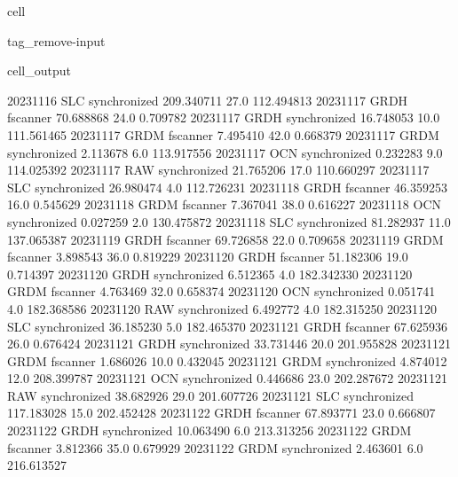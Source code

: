 \documentclass[letterpaper,10pt,english]{jupyterBook}
\begin{document}
\begin{sphinxuseclass}{cell}
\begin{sphinxuseclass}{tag_remove-input}
\begin{sphinxVerbatimOutput}
\begin{sphinxuseclass}{cell_output}
\begin{sphinxVerbatim}[commandchars=\\\{\}]
2023\PYGZhy{}11\PYGZhy{}16          SLC  synchronized  209.340711    27.0  112.494813
2023\PYGZhy{}11\PYGZhy{}17         GRDH      fscanner   70.688868    24.0    0.709782
2023\PYGZhy{}11\PYGZhy{}17         GRDH  synchronized   16.748053    10.0  111.561465
2023\PYGZhy{}11\PYGZhy{}17         GRDM      fscanner    7.495410    42.0    0.668379
2023\PYGZhy{}11\PYGZhy{}17         GRDM  synchronized    2.113678     6.0  113.917556
2023\PYGZhy{}11\PYGZhy{}17          OCN  synchronized    0.232283     9.0  114.025392
2023\PYGZhy{}11\PYGZhy{}17          RAW  synchronized   21.765206    17.0  110.660297
2023\PYGZhy{}11\PYGZhy{}17          SLC  synchronized   26.980474     4.0  112.726231
2023\PYGZhy{}11\PYGZhy{}18         GRDH      fscanner   46.359253    16.0    0.545629
2023\PYGZhy{}11\PYGZhy{}18         GRDM      fscanner    7.367041    38.0    0.616227
2023\PYGZhy{}11\PYGZhy{}18          OCN  synchronized    0.027259     2.0  130.475872
2023\PYGZhy{}11\PYGZhy{}18          SLC  synchronized   81.282937    11.0  137.065387
2023\PYGZhy{}11\PYGZhy{}19         GRDH      fscanner   69.726858    22.0    0.709658
2023\PYGZhy{}11\PYGZhy{}19         GRDM      fscanner    3.898543    36.0    0.819229
2023\PYGZhy{}11\PYGZhy{}20         GRDH      fscanner   51.182306    19.0    0.714397
2023\PYGZhy{}11\PYGZhy{}20         GRDH  synchronized    6.512365     4.0  182.342330
2023\PYGZhy{}11\PYGZhy{}20         GRDM      fscanner    4.763469    32.0    0.658374
2023\PYGZhy{}11\PYGZhy{}20          OCN  synchronized    0.051741     4.0  182.368586
2023\PYGZhy{}11\PYGZhy{}20          RAW  synchronized    6.492772     4.0  182.315250
2023\PYGZhy{}11\PYGZhy{}20          SLC  synchronized   36.185230     5.0  182.465370
2023\PYGZhy{}11\PYGZhy{}21         GRDH      fscanner   67.625936    26.0    0.676424
2023\PYGZhy{}11\PYGZhy{}21         GRDH  synchronized   33.731446    20.0  201.955828
2023\PYGZhy{}11\PYGZhy{}21         GRDM      fscanner    1.686026    10.0    0.432045
2023\PYGZhy{}11\PYGZhy{}21         GRDM  synchronized    4.874012    12.0  208.399787
2023\PYGZhy{}11\PYGZhy{}21          OCN  synchronized    0.446686    23.0  202.287672
2023\PYGZhy{}11\PYGZhy{}21          RAW  synchronized   38.682926    29.0  201.607726
2023\PYGZhy{}11\PYGZhy{}21          SLC  synchronized  117.183028    15.0  202.452428
2023\PYGZhy{}11\PYGZhy{}22         GRDH      fscanner   67.893771    23.0    0.666807
2023\PYGZhy{}11\PYGZhy{}22         GRDH  synchronized   10.063490     6.0  213.313256
2023\PYGZhy{}11\PYGZhy{}22         GRDM      fscanner    3.812366    35.0    0.679929
2023\PYGZhy{}11\PYGZhy{}22         GRDM  synchronized    2.463601     6.0  216.613527

\end{sphinxVerbatim}
\end{sphinxuseclass}
\end{sphinxVerbatimOutput}
\end{sphinxuseclass}
\end{sphinxuseclass}
\end{document}
